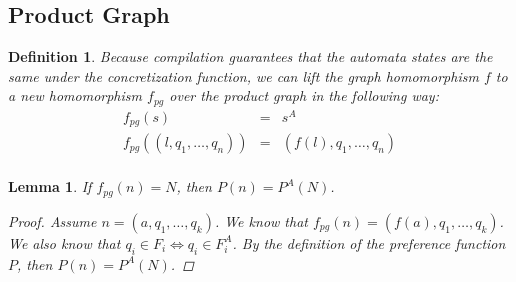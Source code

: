 \documentclass[twocolumn, openany]{sig-alternate-10pt}
\newtheorem{defn}{Definition}
\newtheorem{lem}[thm]{Lemma}
\begin{document}
\vspace{1em}
\subsection{Product Graph}

\begin{defn}
  Because compilation guarantees that the automata states are the same under the concretization function, we can lift the graph homomorphism $f$ to a new homomorphism $f_{pg}$ over the product graph in the following way:
  \[ \begin{array}{rcl}
    f_{pg}( s ) & = & s^A  \\
    f_{pg}( (l,q_1,\ldots,q_n) ) & = & (f(l),q_1,\ldots,q_n) \\
  \end{array} \]
\end{defn}

\vspace{1em}
\begin{lem}
  If $f_{pg}(n) = N$, then $P(n) = P^A(N)$.

  \begin{proof}
    Assume $n = (a,q_1,\dots,q_k)$. We know that $f_{pg}(n) = (f(a),q_1,\dots,q_k)$. 
    We also know that $q_i \in F_i \iff q_i \in F^A_i$. 
    By the definition of the preference function $P$, then $P(n) = P^A(N)$.
  \end{proof}

\end{lem}
\end{document}
